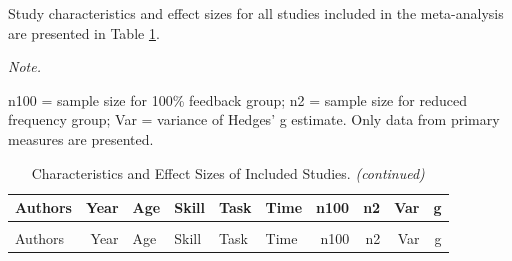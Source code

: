 \documentclass[
  english,
  man, donotrepeattitle,mask,floatsintext]{apa7}
\begin{document}
Study characteristics and effect sizes for all studies included in the meta-analysis are presented in Table \ref{tab:table1}.

\begingroup\fontsize{10}{12}\selectfont

\begin{landscape}
\begin{ThreePartTable}
\begin{TableNotes}
\item \textit{Note.} 
\item n100 = sample size for 100\% feedback group; n2 = sample size for reduced frequency group; Var = variance of Hedges' g estimate. Only data from primary measures are presented.
\end{TableNotes}
\begin{longtable}[l]{lrllllrrrr}
\caption{\label{tab:table1}Characteristics and Effect Sizes of Included Studies.}\\
\toprule
Authors & Year & Age & Skill & Task & Time & n100 & n2 & Var & g\\
\midrule
\endfirsthead
\caption[]{\label{tab:table1}Characteristics and Effect Sizes of Included Studies. \textit{(continued)}}\\
\toprule
Authors & Year & Age & Skill & Task & Time & n100 & n2 & Var & g\\
\midrule
\endhead


\end{longtable}
\end{ThreePartTable}
\end{landscape}
\end{document}

